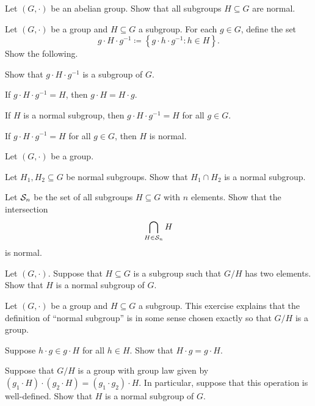 \documentclass[../notes.tex]{subfiles}
\begin{document}
\begin{homework}
    Let $(G,\cdot)$ be an abelian group. Show that all subgroups $H\subseteq G$ are normal.
\end{homework}

\begin{homework}
    Let $(G,\cdot)$ be a group and $H\subseteq G$ a subgroup. For each $g\in G$, define the set
    \[g\cdot H\cdot g^{-1}\coloneqq\left\{g\cdot h\cdot g^{-1}:h\in H\right\}.\]
    Show the following.
    \begin{listalph}
        \item Show that $g\cdot H\cdot g^{-1}$ is a subgroup of $G$.
        \item If $g\cdot H\cdot g^{-1}=H$, then $g\cdot H=H\cdot g$.
        \item If $H$ is a normal subgroup, then $g\cdot H\cdot g^{-1}=H$ for all $g\in G$.
        \item If $g\cdot H\cdot g^{-1}=H$ for all $g\in G$, then $H$ is normal.
    \end{listalph}
\end{homework}

\begin{homework}
    Let $(G,\cdot)$ be a group.
    \begin{listalph}
        \item Let $H_1,H_2\subseteq G$ be normal subgroups. Show that $H_1\cap H_2$ is a normal subgroup.
        \item Let $\mathcal{S}_n$ be the set of all subgroups $H\subseteq G$ with $n$ elements. Show that the intersection
        \[\bigcap_{H\in\mathcal{S}_n}H\]
        is normal.
    \end{listalph}
\end{homework}

\begin{homework}
    Let $(G,\cdot)$. Suppose that $H\subseteq G$ is a subgroup such that $G/H$ has two elements. Show that $H$ is a normal subgroup of $G$.
\end{homework}

\begin{homework}
    Let $(G,\cdot)$ be a group and $H\subseteq G$ a subgroup. This exercise explains that the definition of ``normal subgroup'' is in some sense chosen exactly so that $G/H$ is a group.
    \begin{listalph}
        \item Suppose $h\cdot g\in g\cdot H$ for all $h\in H$. Show that $H\cdot g=g\cdot H$.
        \item Suppose that $G/H$ is a group with group law given by $(g_1\cdot H)\cdot(g_2\cdot H)=(g_1\cdot g_2)\cdot H$. In particular, suppose that this operation is well-defined. Show that $H$ is a normal subgroup of $G$.
    \end{listalph}
\end{homework}
\end{document}
